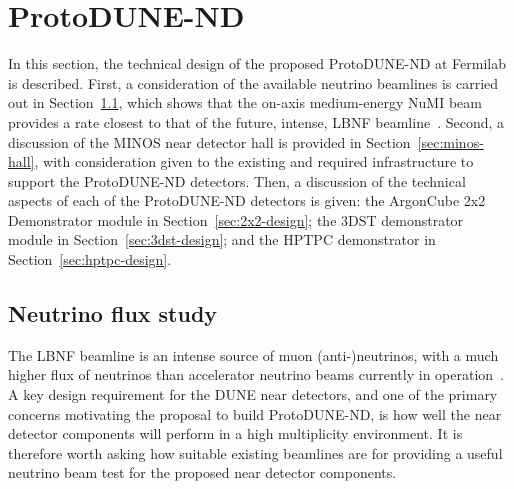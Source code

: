 \section{ProtoDUNE-ND}
\label{sec:protodune-nd}
In this section, the technical design of the proposed ProtoDUNE-ND at Fermilab is described. First, a consideration of the available neutrino beamlines is carried out in Section~\ref{sec:neutrino-flux}, which shows that the on-axis medium-energy NuMI beam provides a rate closest to that of the future, intense, LBNF beamline~\cite{DUNE3}. Second, a discussion of the MINOS near detector hall is provided in Section~\ref{sec:minos-hall}, with consideration given to the existing and required infrastructure to support the ProtoDUNE-ND detectors. Then, a discussion of the technical aspects of each of the ProtoDUNE-ND detectors is given: the ArgonCube 2x2 Demonstrator module in Section~\ref{sec:2x2-design}; the 3DST demonstrator module in Section~\ref{sec:3dst-design}; and the HPTPC demonstrator in Section~\ref{sec:hptpc-design}. 

\subsection{Neutrino flux study}
\label{sec:neutrino-flux}
The LBNF beamline is an intense source of muon (anti-)neutrinos, with a much higher flux of neutrinos than accelerator neutrino beams currently in operation~\cite{DUNE3}. A key design requirement for the DUNE near detectors, and one of the primary concerns motivating the proposal to build ProtoDUNE-ND, is how well the near detector components will perform in a high multiplicity environment. It is therefore worth asking how suitable existing beamlines are for providing a useful neutrino beam test for the proposed near detector components.

